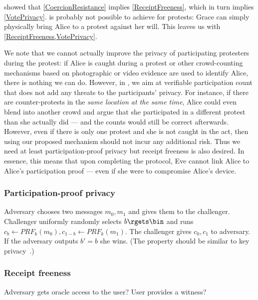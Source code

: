  showed that \cref{CoercionResistance} implies \cref{ReceiptFreeness}, which in turn implies \cref{VotePrivacy}. 
 is probably not possible to achieve for protests:
\eg Grace can simply physically bring Alice to a protest against her will.
This leaves us with \cref{ReceiptFreeness,VotePrivacy}.

We note that we cannot actually improve the privacy of participating protesters during the protest: if Alice is caught during a protest or other crowd-counting mechanisms based on photographic or video evidence are used to identify Alice, there is nothing we can do.
However, in \PRIVO, we aim at verifiable participation count that does not add any threats to the participants' privacy. 
For instance, if there are counter-protests in the \emph{same location at the same time}, Alice could even blend into another crowd and argue that she participated in a different protest than she actually did --- and the counts would still be correct afterwards.
However, even if there is only one protest and she is not caught in the act, then using our proposed mechanism should not incur any additional risk.
Thus we need at least participation-proof privacy but receipt freeness is also desired.
In essence, this means that upon completing the protocol, Eve cannot link Alice to Alice's participation proof --- even if she were to compromise Alice's device.

\subsubsection{Participation-proof privacy}

\begin{definition}
  Adversary chooses two messages \(m_0, m_1\) and gives them to the challenger.
  Challenger uniformly randomly selects \(b\rgets \bin\) and runs \(c_b \gets 
    PRF_k(m_0), c_{1-b} \gets PRF_k(m_1)\).
  The challenger gives \(c_0, c_1\) to adversary.
  If the adversary outputs \(b' = b\) she wins.
  (The property should be similar to key privacy~\cite{KeyPrivacy}.)
\end{definition}

\subsubsection{Receipt freeness}

\begin{definition}
  Adversary gets oracle access to the user?
  User provides a witness?
\end{definition}

